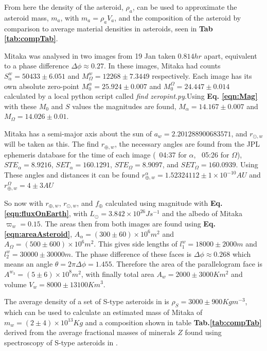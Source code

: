 \documentclass[10pt,twocolumn]{revtex4}    %
\newcommand*{\astrosun}{{\odot}}
\newcommand*{\earth}{{\oplus}}
\newcommand{\refeq}[1]{\textbf{Eq.#1}}
\newcommand{\reftab}[1]{\textbf{Tab.#1}}
\begin{document}
From here the density of the asteroid, $\rho_a$, can be used to approximate the asteroid mass, $m_a$, with $m_a = \rho_a V_a$, and the composition of the asteroid by comparison to average material densities in asteroids, seen in \textbf{Tab \ref{tab:compTab}}.

Mitaka was analysed in two images from 19 Jan taken $0.814hr$ apart, equivalent to a phase difference $\Delta \phi \approx 0.27$. In these images, Mitaka had counts $S^w_\alpha = 50433 \pm 6.051$ and $M^w_\Omega = 12268 \pm 7.3449$ respectively. Each image has its own absolute zero-point $M_0^\alpha = 25.924 \pm 0.007$ and $M_0^\Omega = 24.447 \pm 0.014$ calculated by a local python script called \textit{find \textunderscore zeropint.py}.Using \textbf{Eq. \ref{eqn:Mag}} with these $M_0$ and $S$ values the magnitudes are found, $M_{\alpha} = 14.167 \pm 0.007$ and $M_\Omega = 14.026 \pm 0.01$. 

Mitaka has a semi-major axis about the sun of $a_w = 2.201288900683571$, and $r_{\astrosun,w}$ will be taken as this. The find $r_{\earth,w}$, the necessary angles are found from the JPL ephemeris database \cite{jplEphAngle} for the time of each image (~04:37 for $\alpha$, ~05:26 for $\Omega$), $STE_\alpha = 8.9216$, $SET_\alpha = 160.1291$, $STE_\Omega = 8.9097$, and $SET_\Omega = 160.0939$. Using These angles and distances it can be found $r_{\earth,w}^\alpha = 1.52324112 \pm 1\times10^{-10}AU$ and $r_{\earth,w}^\Omega = 4 \pm 3AU$


So now with $r_{\earth,w}$, $r_{\astrosun,w}$, and $f_\earth$ calculated using magnitude with \refeq{\ref{eqn:fluxOnEarth}}, with $L_\astrosun = 3.842\times10^{26} Js^{-1}$
\textbf{\cite{LSol}} and the albedo of Mitaka $\varpi_w = 0.15$. The areas then from both images are found using \textbf{Eq. \ref{eqn:areaAsteroid}}, $A_\alpha=(300 \pm 60)\times10^6 m^2$ and $A_\Omega = (500\pm 600)\times10^6 m^2$. This gives side lengths of $l^w_1=18000
 \pm 2000 m$ and $l^w_2 = 30000
 \pm 30000 m$. The phase difference of these faces is $\Delta \phi \approx 0.268$ which means an angle $\theta = 2\pi \Delta \phi = 1.455$. Therefore the area of the parallelogram face is $A^{w_3} = (5 \pm 6)\times10^8 m^2$, with finally total area $A_w = 2000 \pm 3000 Km^2$ and volume $V_w = 8000 \pm 13100 Km^3$.


The average density of a set of S-type asteroids in \textbf{\cite{STypeDenstiy}} is $\rho_S = 3000 \pm 900 Kg m^{-3}$, which can be used to calculate an estimated mass of Mitaka of $m_w = (2 \pm 4)\times10^{13} Kg$ and a composition shown in table \reftab{\ref{tab:compTab}} derived from the average fractional masses of minerals $Z$ found using spectroscopy of S-type asteroids in \textbf{\cite{sComp}}.
\end{document}
